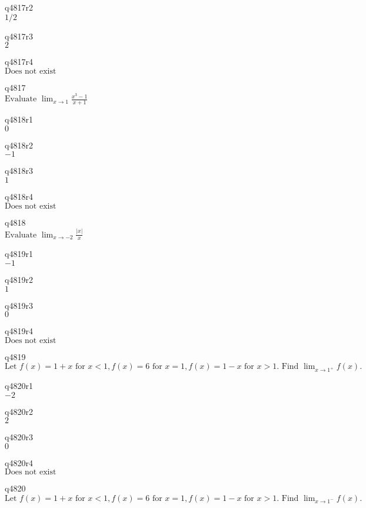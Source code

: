 q4817r2\\
\(\displaystyle 1/2 \)

q4817r3\\
\(\displaystyle 2 \)

q4817r4\\
\(\displaystyle \text{Does not exist} \)

q4817\\
\(\displaystyle \text{Evaluate } \lim_{x \rightarrow 1} \frac{x^3 - 1}{x+1} \)

q4818r1\\
\(\displaystyle 0 \)

q4818r2\\
\(\displaystyle -1 \)

q4818r3\\
\(\displaystyle 1 \)

q4818r4\\
\(\displaystyle \text{Does not exist} \)

q4818\\
\(\displaystyle \text{Evaluate } \lim_{x \rightarrow -2} \frac{|x|}{x} \)

q4819r1\\
\(\displaystyle -1 \)

q4819r2\\
\(\displaystyle 1 \)

q4819r3\\
\(\displaystyle 0 \)

q4819r4\\
\(\displaystyle \text{Does not exist} \)

q4819\\
\(\displaystyle \text{Let } f(x) = 1+x \text{ for } x < 1, f(x) = 6 \text{ for } x = 1, f(x) = 1 - x \text{ for } x > 1. \text{ Find } \lim_{x \rightarrow 1^+} f(x). \)

q4820r1\\
\(\displaystyle -2 \)

q4820r2\\
\(\displaystyle 2 \)

q4820r3\\
\(\displaystyle 0 \)

q4820r4\\
\(\displaystyle \text{Does not exist} \)

q4820\\
\(\displaystyle \text{Let } f(x) = 1+x \text{ for } x < 1, f(x) = 6 \text{ for } x = 1, f(x) = 1 - x \text{ for } x > 1. \text{ Find } \lim_{x \rightarrow 1^-} f(x). \)

